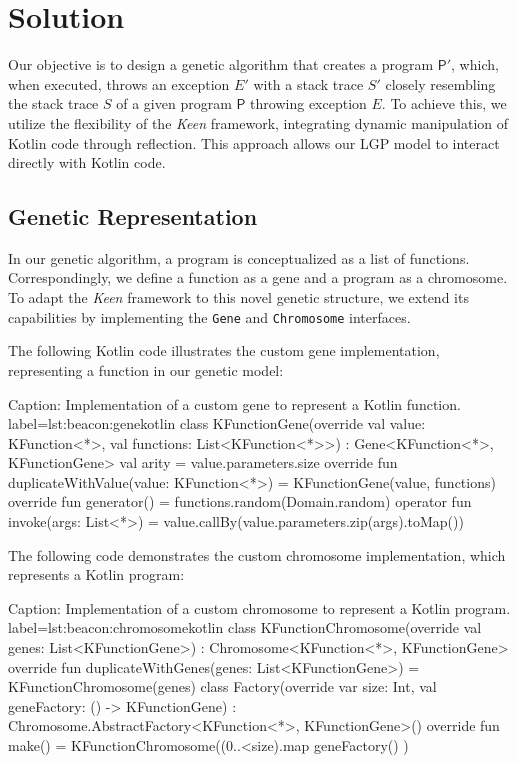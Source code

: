 \section{Solution}
\label{sec:solution}

    Our objective is to design a genetic algorithm that creates a program \(\mathsf{P'}\), which, when executed, 
    throws an exception \(E'\) with a stack trace \(S'\) closely resembling the stack trace \(S\) of a given 
    program \(\mathsf{P}\) throwing exception \(E\). To achieve this, we utilize the flexibility of the \textit{Keen} 
    framework, integrating dynamic manipulation of Kotlin code through reflection. This approach allows our LGP model to
    interact directly with Kotlin code.

    \subsection{Genetic Representation}
        In our genetic algorithm, a program is conceptualized as a list of functions. Correspondingly, we define 
        a function as a gene and a program as a chromosome. To adapt the \textit{Keen} framework to this novel genetic 
        structure, we extend its capabilities by implementing the \texttt{Gene} and \texttt{Chromosome} interfaces.

        The following Kotlin code illustrates the custom gene implementation, representing a function in our genetic model:
        \begin{code}{
            Caption: Implementation of a custom gene to represent a Kotlin function.
        }{label=lst:beacon:gene}{kotlin}
            class KFunctionGene(override val value: KFunction<*>, val functions: List<KFunction<*>>) :
                Gene<KFunction<*>, KFunctionGene> {
                val arity = value.parameters.size
                override fun duplicateWithValue(value: KFunction<*>) = KFunctionGene(value, functions)
                override fun generator() = functions.random(Domain.random)
                operator fun invoke(args: List<*>) = value.callBy(value.parameters.zip(args).toMap())
            }
        \end{code}

        The following code demonstrates the custom chromosome implementation, which represents a Kotlin program:
        \begin{code}{
            Caption: Implementation of a custom chromosome to represent a Kotlin program.
        }{label=lst:beacon:chromosome}{kotlin}
            class KFunctionChromosome(override val genes: List<KFunctionGene>) 
                : Chromosome<KFunction<*>, KFunctionGene> {
                override fun duplicateWithGenes(genes: List<KFunctionGene>) = 
                    KFunctionChromosome(genes)
                class Factory(override var size: Int, val geneFactory: () -> KFunctionGene) :
                    Chromosome.AbstractFactory<KFunction<*>, KFunctionGene>() {
                    override fun make() = KFunctionChromosome((0..<size).map { geneFactory() })
                }
            }
        \end{code}

